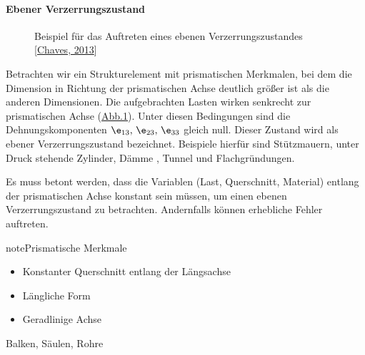 \documentclass[letterpaper,10pt,german]{jupyterBook}
\let\sphinxpxdimen\pdfpxdimen\else\newdimen\sphinxpxdimen
\begin{document}
\paragraph{Ebener Verzerrungszustand}
\label{\detokenize{chapters/chapter1/elasticity:ebener-verzerrungszustand}}
\begin{figure}[htbp]
\centering
\capstart

\noindent\sphinxincludegraphics[height=300\sphinxpxdimen]{{EVZ}.png}
\caption{Beispiel für das Auftreten eines ebenen Verzerrungszustandes {[}\hyperlink{cite.quellen:id10}{Chaves, 2013}{]}}\label{\detokenize{chapters/chapter1/elasticity:evz}}\end{figure}

\sphinxAtStartPar
Betrachten wir ein Strukturelement mit prismatischen Merkmalen, bei dem die Dimension in Richtung der prismatischen Achse deutlich größer ist als die anderen Dimensionen. Die aufgebrachten Lasten wirken senkrecht zur prismatischen Achse (\hyperref[\detokenize{chapters/chapter1/elasticity:evz}]{Abb.\@ \ref{\detokenize{chapters/chapter1/elasticity:evz}}}). Unter diesen Bedingungen sind die Dehnungskomponenten \(\e_{13},\, \e_{23}, \, \e_{33}\) gleich null. Dieser Zustand wird als ebener Verzerrungszustand bezeichnet. Beispiele hierfür sind Stützmauern, unter Druck stehende Zylinder, Dämme , Tunnel und Flachgründungen.

\sphinxAtStartPar
Es muss betont werden, dass die Variablen (Last, Querschnitt, Material) entlang der prismatischen Achse konstant sein müssen, um einen ebenen Verzerrungszustand zu betrachten. Andernfalls können erhebliche Fehler auftreten.

\begin{sphinxadmonition}{note}{Prismatische Merkmale}
\begin{itemize}
\item {} 
\sphinxAtStartPar
Konstanter Querschnitt entlang der Längsachse

\item {} 
\sphinxAtStartPar
Längliche Form

\item {} 
\sphinxAtStartPar
Geradlinige Achse

\end{itemize}

\sphinxAtStartPar
{} Balken, Säulen, Rohre
\end{sphinxadmonition}
\end{document}
